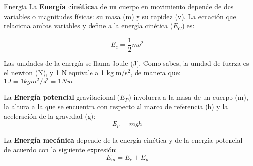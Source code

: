 \begin{infocard}{Energía}
    La   \textbf{Energía cinética}a de un cuerpo en movimiento depende de
    dos variables o magnitudes f\'isicas: su masa (m) y su rapidez (v). La ecuaci\'on
    que relaciona ambas variables y define a la energ\'ia cin\'etica ($E_C$) es:

    \[E_c=\frac{1}{2}mv^2 \]

    Las unidades de la energía se llama Joule (J). Como sabes, la unidad de fuerza es el
    newton (N), y 1 N equivale a 1 kg m/s$^2$, de manera que: $1 J = 1 kg m^2/s^2 = 1 Nm $
    \tcblower

    La \textbf{Energía potencial} gravitacional ($E_P$) involucra
    a la masa de un cuerpo (m), la altura a la que se encuentra con respecto al
    marco de referencia (h) y la aceleraci\'on de la gravedad (g):
    \[E_p=mgh\]
    \DrawLine

    La \textbf{Energía mecánica} depende de la energ\'ia
    cin\'etica y de la energ\'ia potencial de acuerdo con la siguiente expresi\'on:
    \[E_m=E_c+E_p\]
\end{infocard}

